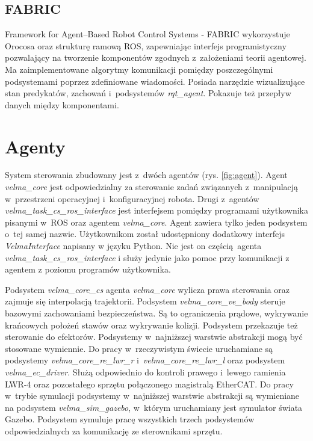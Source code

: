 	\subsection{FABRIC}
	Framework for Agent–Based Robot Control Systems - FABRIC\cite{bib:fabric} wykorzystuje Orocosa oraz strukturę ramową ROS, zapewniając interfejs programistyczny pozwalający na tworzenie komponentów zgodnych z~założeniami teorii agentowej. Ma zaimplementowane algorytmy komunikacji pomiędzy poszczególnymi podsystemami poprzez zdefiniowane wiadomości. Posiada narzędzie wizualizujące stan predykatów, zachowań i~podsystemów \textit{rqt\_agent}\cite{bib:rqtAgent}. Pokazuje też przepływ danych między komponentami.
	
	
	
\section{Agenty}
System sterowania \cite{bib:velma2} zbudowany jest z~dwóch agentów (rys. \ref{fig:agent}). Agent \textit{velma\_core} jest odpowiedzialny za sterowanie zadań związanych z~manipulacją w~przestrzeni operacyjnej i~konfiguracyjnej robota. Drugi z~agentów \textit{velma\_task\_cs\_ros\_interface} jest interfejsem pomiędzy programami użytkownika pisanymi w~ROS oraz agentem \textit{velma\_core}. Agent zawiera tylko jeden podsystem o~tej samej nazwie. Użytkownikom został udostępniony dodatkowy interfejs \textit{VelmaInterface} napisany w języku Python. Nie  jest on częścią agenta \textit{velma\_task\_cs\_ros\_interface} i służy jedynie jako pomoc przy komunikacji z agentem z poziomu programów użytkownika.

Podsystem \textit{velma\_core\_cs} agenta \textit{velma\_core} wylicza prawa sterowania oraz zajmuje się interpolacją trajektorii. Podsystem \textit{velma\_core\_ve\_body} steruje bazowymi zachowaniami bezpieczeństwa. Są to ograniczenia prądowe, wykrywanie krańcowych położeń stawów oraz wykrywanie kolizji. Podsystem przekazuje też sterowanie do efektorów. Podsystemy w~najniższej warstwie abstrakcji mogą być stosowane wymiennie. Do pracy w~rzeczywistym świecie uruchamiane są podsystemy \textit{velma\_core\_re\_lwr\_r} i~\textit{velma\_core\_re\_lwr\_l} oraz podsystem \textit{velma\_ec\_driver}. Służą odpowiednio do kontroli prawego i~lewego ramienia LWR-4 oraz pozostałego sprzętu połączonego magistralą EtherCAT. Do pracy w~trybie symulacji podsystemy w~najniższej warstwie abstrakcji są wymieniane na podsystem \textit{velma\_sim\_gazebo}, w~którym uruchamiany jest symulator świata Gazebo. Podsystem symuluje pracę wszystkich trzech podsystemów odpowiedzialnych za komunikację ze sterownikami sprzętu. 

